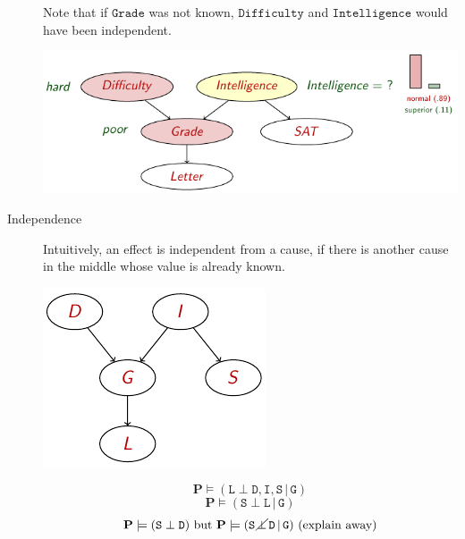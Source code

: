 \begin{description}
\begin{descriptionlist}
\begin{example}
                    Note that if $\texttt{Grade}$ was not known, 
                    $\texttt{Difficulty}$ and $\texttt{Intelligence}$ would have been independent.
                    \begin{center}
                        \includegraphics[width=0.75\linewidth]{img/_explainaway_example.pdf}
                    \end{center}
                \end{example}
        \end{descriptionlist}

    \item[Independence] 
        Intuitively, an effect is independent from a cause, 
        if there is another cause in the middle whose value is already known.
        \begin{example}
            \phantom{}

            \begin{minipage}{.3\linewidth}
                \centering
                \includegraphics[width=0.85\linewidth]{img/_independence_example.pdf}
            \end{minipage}
            \begin{minipage}{.6\linewidth}
                \[ \textbf{P} \models (\texttt{L} \perp \texttt{D}, \texttt{I}, \texttt{S} \,\vert\, \texttt{G}) \]
                \[ \textbf{P} \models (\texttt{S} \perp \texttt{L} \,\vert\, \texttt{G}) \]
                \[ \textbf{P} \models (\texttt{S} \perp \texttt{D}) \text{ but } 
                    \textbf{P} \models (\texttt{S} \,\cancel{\perp}\, \texttt{D} \,\vert\, \texttt{G}) \text{ (explain away)} \]
            \end{minipage}
        \end{example}



\end{description}
